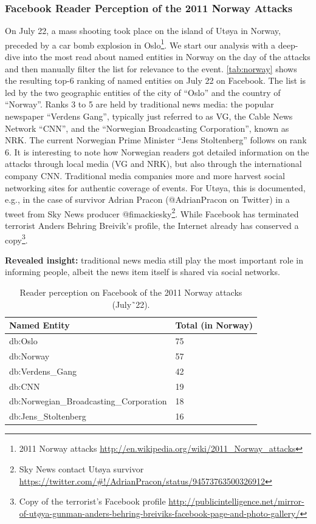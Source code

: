 \documentclass{iosart2c}
\begin{document}
\subsubsection{Facebook Reader Perception of the 2011 Norway Attacks}
On July 22, a mass shooting took place on the island of Utøya in Norway, preceded by a car bomb explosion in Oslo\footnote{2011 Norway attacks \url{http://en.wikipedia.org/wiki/2011_Norway_attacks}}.
We start our analysis with a deep-dive into the most read about named entities in Norway on the day of the attacks and then manually filter the list for relevance to the event.
\autoref{tab:norway} shows the resulting top-6 ranking of named entities on July 22 on Facebook.
The list is led by the two geographic entities of the city of ``Oslo'' and the country of ``Norway''.
Ranks 3 to 5 are held by traditional news media: the popular newspaper ``Verdens Gang'', typically just referred to as VG, the Cable News Network ``CNN'', and the ``Norwegian Broadcasting Corporation'', known as NRK.
The current Norwegian Prime Minister ``Jens Stoltenberg'' follows on rank 6.
It is interesting to note how Norwegian readers got detailed information on the attacks through local media (VG and NRK), but also through the international company CNN.
Traditional media companies more and more harvest social networking sites for authentic coverage of events.
For Utøya, this is documented, e.g., in the case of survivor Adrian Pracon (@AdrianPracon on Twitter) in a tweet from Sky News producer @fimackiesky\footnote{Sky News contact Utøya survivor \url{https://twitter.com/\#!/AdrianPracon/status/94573763500326912}}.
While Facebook has terminated terrorist Anders Behring Breivik's profile, the Internet already has conserved a copy\footnote{Copy of the terrorist's Facebook profile \url{http://publicintelligence.net/mirror-of-utøya-gunman-anders-behring-breiviks-facebook-page-and-photo-gallery/}}. 

\textbf{Revealed insight:}
traditional news media still play the most important role in informing people, albeit the news item itself is shared via social networks. 

\begin{table}
    \begin{tabular}{ | l | l |}
    \hline
	\textbf{Named Entity} & \textbf{Total (in Norway)}\\ \hline
	db:Oslo & 75\\
	db:Norway & 57\\
	db:Verdens\_Gang & 42\\
	db:CNN & 19\\
	db:Norwegian\_Broadcasting\_Corporation & 18\\
	db:Jens\_Stoltenberg & 16\\
    \hline
  \end{tabular}
  \caption{Reader perception on Facebook of the 2011 Norway attacks (July˜22).}
  \label{tab:norway}  
\end{table}
\end{document}
